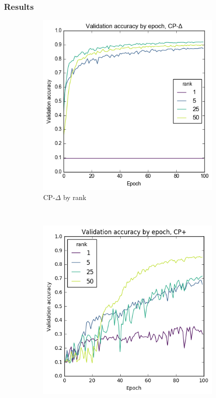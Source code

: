 \subsubsection{Results}

\begin{figure}
\begin{subfigure}[t]{0.45\textwidth}
	\includegraphics[width=\textwidth]{exps/mnist/cp-del-rank}
	\caption{CP-\(\Delta\) by rank}
\end{subfigure}~
\begin{subfigure}[t]{0.45\textwidth}
	\includegraphics[width=\textwidth]{exps/mnist/cp+rank}

\end{subfigure}
\end{figure}
